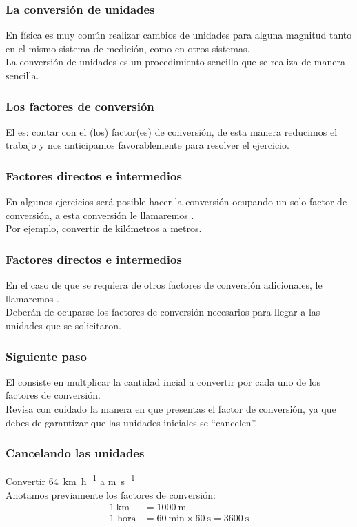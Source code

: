 \documentclass[14pt]{beamer}
\begin{document}
\begin{frame}
\frametitle{La conversión de unidades}
En física es muy común realizar cambios de unidades para alguna magnitud tanto en el mismo sistema de medición, como en otros sistemas.
\\
\bigskip
\pause
La conversión de unidades es un procedimiento sencillo que se realiza de manera sencilla.
\end{frame}
\begin{frame}
\frametitle{Los factores de conversión}
El  es: \pause contar con el (los) factor(es) de conversión, de esta manera reducimos el trabajo y nos anticipamos favorablemente para resolver el ejercicio.
\end{frame}
\begin{frame}
\frametitle{Factores directos e intermedios}
En algunos ejercicios será posible hacer la conversión ocupando un solo factor de conversión, \pause a esta conversión le llamaremos .
\\
\bigskip
\pause
Por ejemplo, convertir de kilómetros a metros.
\end{frame}
\begin{frame}
\frametitle{Factores directos e intermedios}
En el caso de que se requiera de otros factores de conversión adicionales, le llamaremos .
\\
\bigskip
\pause
Deberán de ocuparse los factores de conversión necesarios para llegar a las unidades que se solicitaron.
\end{frame}
\begin{frame}
\frametitle{Siguiente paso}
El  consiste en multplicar la cantidad incial a convertir por cada uno de los factores de conversión.
\\
\bigskip
\pause
Revisa con cuidado la manera en que presentas el factor de conversión, ya que debes de garantizar que las unidades iniciales se \enquote{cancelen}.
\end{frame}
\begin{frame}
\frametitle{Cancelando las unidades}
Convertir \SI{64}{\kilo\meter\per\hour} a \unit{\meter\per\second}
\\
\bigskip
\pause
Anotamos previamente los factores de conversión:
\begin{align*}
\SI{1}{\kilo\meter} &= \SI{1000}{\meter} \\[0.5em]
1 \, \, \text{hora} &= \SI{60}{\minute} \times \SI{60}{\second} = \SI{3600}{\second}
\end{align*}
\end{frame}
\end{document}
